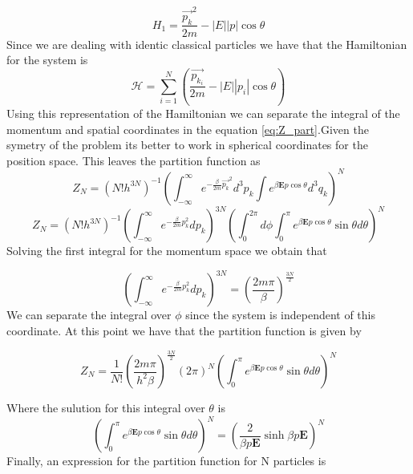 \documentclass{article}
\begin{document}
\begin{equation}
    H_1 = \frac{\vec{p_k}^2}{2m} -|E||p|\cos \theta
\end{equation}
Since we are dealing with identic classical particles we have that the Hamiltonian for the system is
\begin{equation}
    \mathcal{H} = \sum_{i=1}^N \left( \frac{\vec{p_{k}_{i}}}{2m} -|E||p_i|\cos \theta \right)
\end{equation}
Using this representation of the Hamiltonian we can separate the integral of the momentum and spatial coordinates in the equation \ref{eq:Z_part}.Given the symetry of the problem its better to work in spherical coordinates for the position space. This leaves the partition function as
\begin{equation}
    Z_N = \left( N! h^{3N}\right)^{-1} \left( \int_{-\infty}^{\infty} e^{- \frac{\beta}{2m}\vec{p_{k}}^2}d^{3}p_k \int e^{\beta \textbf{E} p \cos \theta}d^{3}q_k \right)^N 
\end{equation}
\begin{equation*}
   Z_N =  \left( N! h^{3N}\right)^{-1} \left(\int_{-\infty}^{\infty} e^{- \frac{\beta}{2m} p_{k}^2}dp_k\right)^{3N} \left(\int_{0}^{2\pi} d\phi \int_{0}^{\pi} e^{\beta \textbf{E} p \cos \theta}\sin\theta d\theta \right)^{N}
\end{equation*}
Solving the first integral for the momentum space we obtain that

\begin{equation*}
    \left(\int_{-\infty}^{\infty} e^{- \frac{\beta}{2m} p_{k}^2}dp_k\right)^{3N} = \left( \frac{2m\pi}{\beta} \right)^{\frac{3N}{2}}
\end{equation*}
We can separate the integral over $\phi$ since the system is independent of this coordinate. At this point we have that the partition function is given by

\begin{equation}
    Z_N = \frac{1}{N!}\left( \frac{2m\pi}{h^2 \beta} \right)^{\frac{3N}{2}} (2\pi)^N  \left( \int_{0}^{\pi} e^{\beta \textbf{E} p \cos \theta}\sin\theta d\theta \right)^{N}
\end{equation}

Where the sulution for this integral over $\theta$ is
\begin{equation*}
\left( \int_{0}^{\pi} e^{\beta \textbf{E} p \cos \theta}\sin\theta d\theta \right)^{N} = \left( \frac{2}{\beta p \textbf{E}} \sinh{\beta p \textbf{E}} \right)^{N}
\end{equation*}
Finally, an expression for the partition function for N particles is
\end{document}
